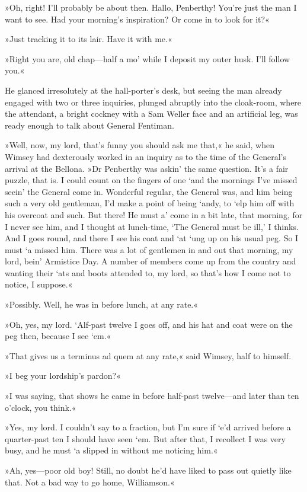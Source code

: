 »Oh, right! I'll probably be about then. Hallo, Penberthy! You're just the man I want to see. Had your morning's inspiration? Or come in to look for it?«

»Just tracking it to its lair. Have it with me.«

»Right you are, old chap—half a mo' while I deposit my outer husk. I'll follow you.«

He glanced irresolutely at the hall-porter's desk, but seeing the man already engaged with two or three inquiries, plunged abruptly into the cloak-room, where the attendant, a bright cockney with a Sam Weller face and an artificial leg, was ready enough to talk about General Fentiman.

»Well, now, my lord, that's funny you should ask me that,« he said, when Wimsey had dexterously worked in an inquiry as to the time of the General's arrival at the Bellona. »Dr Penberthy was askin' the same question. It's a fair puzzle, that is. I could count on the fingers of one `and the mornings I've missed seein' the General come in. Wonderful regular, the General was, and him being such a very old gentleman, I'd make a point of being `andy, to `elp him off with his overcoat and such. But there! He must a' come in a bit late, that morning, for I never see him, and I thought at lunch-time, `The General must be ill,' I thinks. And I goes round, and there I see his coat and `at `ung up on his usual peg. So I must `a missed him. There was a lot of gentlemen in and out that morning, my lord, bein' Armistice Day. A number of members come up from the country and wanting their `ats and boots attended to, my lord, so that's how I come not to notice, I suppose.«

»Possibly. Well, he was in before lunch, at any rate.«

»Oh, yes, my lord. `Alf-past twelve I goes off, and his hat and coat were on the peg then, because I see `em.«

»That gives us a terminus ad quem at any rate,« said Wimsey, half to himself.

»I beg your lordship's pardon?«

»I was saying, that shows he came in before half-past twelve—and later than ten o'clock, you think.«

»Yes, my lord. I couldn't say to a fraction, but I'm sure if `e'd arrived before a quarter-past ten I should have seen `em. But after that, I recollect I was very busy, and he must `a slipped in without me noticing him.«

»Ah, yes—poor old boy! Still, no doubt he'd have liked to pass out quietly like that. Not a bad way to go home, Williamson.«


